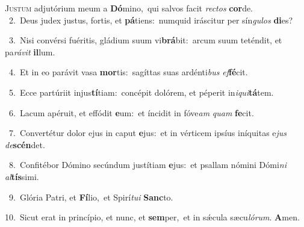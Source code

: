 \lettrine{\initial\textcolor{\initialcolor}{J}}{ustum} adjutórium meum a \textbf{Dó}\-mino,~\star qui salvos facit \textit{rec}\-\textit{tos} \textbf{cor}\-de.\\
{\numbfont\textcolor{\numbcolor}{~2.}}~Deus judex justus, fortis, et \textbf{pá}\-tiens:~\star numquid iráscitur per sín\-\textit{gu}\-\textit{los} \textbf{di}\-es?\par
{\numbfont\textcolor{\numbcolor}{~3.}}~Nisi convérsi fuéritis, gládium suum vi\-\textbf{brá}\-bit:~\star arcum suum teténdit, et pa\-\textit{rá}\-\textit{vit} \textbf{il}\-lum.\par
{\numbfont\textcolor{\numbcolor}{~4.}}~Et in eo parávit vasa \textbf{mor}\-tis:~\star sagíttas suas ardénti\textit{bus} \textit{ef}\-\textbf{fé}cit.\par
{\numbfont\textcolor{\numbcolor}{~5.}}~Ecce partúriit injus\-\textbf{tí}\-tiam:~\star concépit dolórem, et péperit in\-\textit{i}\-\textit{qui}\textbf{tá}tem.\par
{\numbfont\textcolor{\numbcolor}{~6.}}~Lacum apéruit, et effódit \textbf{e}\-um:~\star et íncidit in fóve\textit{am} \textit{quam} \textbf{fe}\-cit.\par
{\numbfont\textcolor{\numbcolor}{~7.}}~Convertétur dolor ejus in caput \textbf{e}\-jus:~\star et in vérticem ipsíus iníquitas e\textit{jus} \textit{de}\-\textbf{scén}det.\par
{\numbfont\textcolor{\numbcolor}{~8.}}~Confitébor Dómino secúndum justítiam \textbf{e}\-jus:~\star et psallam nómini Dómi\textit{ni} \textit{al}\-\textbf{tís}simi.\par
{\numbfont\textcolor{\numbcolor}{~9.}}~Glória Patri, et \textbf{Fí}\-lio,~\star et Spirí\-\textit{tu}\-\textit{i} \textbf{Sanc}\-to.\par
{\numbfont\textcolor{\numbcolor}{10.}}~Sicut erat in princípio, et nunc, et \textbf{sem}\-per,~\star et in sǽcula sæcu\-\textit{ló}\-\textit{rum}. \textbf{A}\-men.\par
